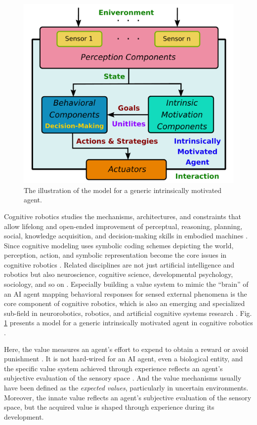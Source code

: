 \documentclass[letterpaper]{article} %
\begin{document}
\begin{figure}[t]
    \centering
    \includegraphics[width=\linewidth]{./figures/innate.pdf}
    \caption{The illustration of the model for a generic intrinsically motivated agent.}
    \label{fig:generic_motivated}
\end{figure}

Cognitive robotics studies the mechanisms, architectures, and constraints that allow lifelong and open-ended improvement of perceptual, reasoning, planning, social, knowledge acquisition, and decision-making skills in embodied machines \cite{merrick2017value}. Since cognitive modeling uses symbolic coding schemes depicting the world, perception, action, and symbolic representation become the core issues in cognitive robotics \cite{yang2019self,yang2020hierarchical,yang2021can}. Related disciplines are not just artificial intelligence and robotics but also neuroscience, cognitive science, developmental psychology, sociology, and so on \cite{asada2009cognitive}. Especially building a value system to mimic the ``brain'' of an AI agent mapping behavioral responses for sensed external phenomena is the core component of cognitive robotics, which is also an emerging and specialized sub-field in neurorobotics, robotics, and artificial cognitive systems research \cite{yang2023understanding}. Fig. \ref{fig:generic_motivated} presents a model for a generic intrinsically motivated agent in cognitive robotics \cite{merrick2013novelty}.

Here, the value measures an agent's effort to expend to obtain a reward or avoid punishment \cite{yang2020needs}. It is not hard-wired for an AI agent, even a biological entity, and the specific value system achieved through experience reflects an agent's subjective evaluation of the sensory space \cite{10.1145/3555776.3577642}. And the value mechanisms usually have been defined as the {\it expected values}, particularly in uncertain environments. Moreover, the innate value reflects an agent's subjective evaluation of the sensory space, but the acquired value is shaped through experience during its development.
\end{document}
